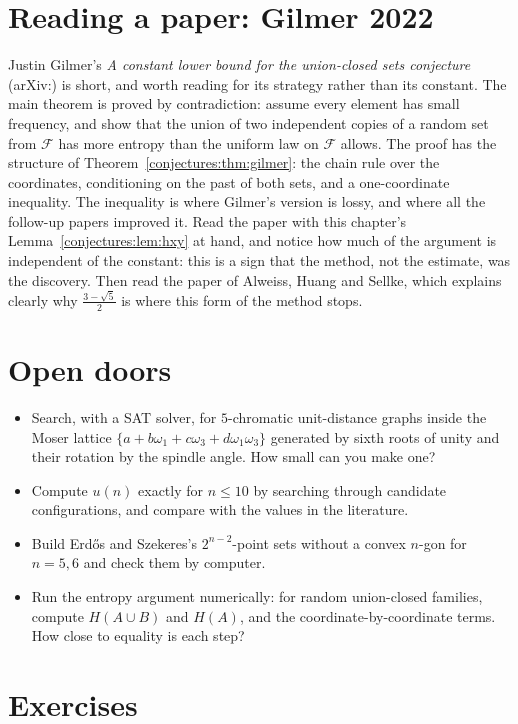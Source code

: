 \section{Reading a paper: Gilmer 2022}

Justin Gilmer's \emph{A constant lower bound for the union-closed sets conjecture} (arXiv:) is short, and worth reading for its strategy rather
than its constant. The main theorem is proved by contradiction: assume every element has small frequency, and show that the union of two independent
copies of a random set from $\mathcal F$ has more entropy than the uniform law on $\mathcal F$ allows. The proof has the structure of
Theorem~\ref{conjectures:thm:gilmer}: the chain rule over the coordinates, conditioning on the past of both sets, and a one-coordinate inequality. The inequality is
where Gilmer's version is lossy, and where all the follow-up papers improved it. Read the paper with this chapter's Lemma~\ref{conjectures:lem:hxy} at hand, and
notice how much of the argument is independent of the constant: this is a sign that the method, not the estimate, was the discovery. Then read the
paper of Alweiss, Huang and Sellke, which explains clearly why $\frac{3-\sqrt5}2$ is where this form of the method stops.

\section{Open doors}

\begin{itemize}
\item Search, with a SAT solver, for $5$-chromatic unit-distance graphs inside the Moser lattice $\{a+b\omega_1+c\omega_3+d\omega_1\omega_3\}$ generated
by sixth roots of unity and their rotation by the spindle angle. How small can you make one?
\item Compute $u(n)$ exactly for $n\le10$ by searching through candidate configurations, and compare with the values in the literature.
\item Build Erd\H os and Szekeres's $2^{n-2}$-point sets without a convex $n$-gon for $n=5,6$ and check them by computer.
\item Run the entropy argument numerically: for random union-closed families, compute $H(A\cup B)$ and $H(A)$, and the coordinate-by-coordinate terms.
How close to equality is each step?
\end{itemize}

\section{Exercises}

